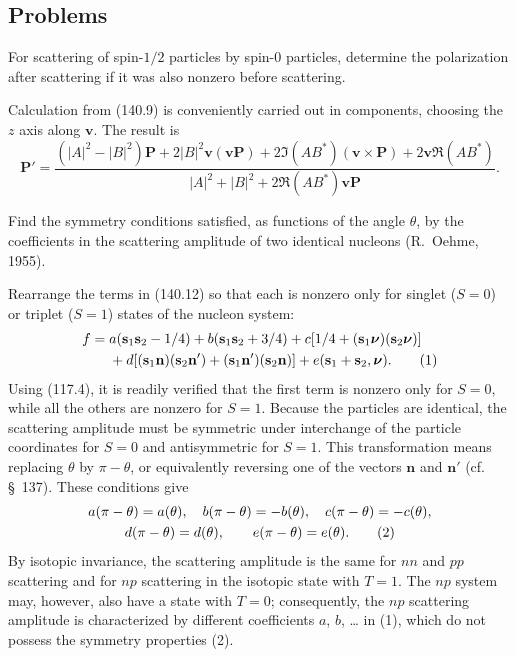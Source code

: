 \subsection*{Problems}

 For scattering of spin-$1/2$ particles by spin-0 particles, determine the polarization after scattering if it was also nonzero before scattering.

\SolutionHeading Calculation from (140.9) is conveniently carried out in components, choosing the $z$ axis along $\mathbf v$. The result is
\[
 \mathbf P'=\frac{(|A|^2-|B|^2)\mathbf P+2|B|^2\mathbf v(\mathbf v\mathbf P)+2\Im(AB^*)(\mathbf v\times\mathbf P)+2\mathbf v\Re(AB^*)}{|A|^2+|B|^2+2\Re(AB^*)\mathbf v\mathbf P}.
\]

 Find the symmetry conditions satisfied, as functions of the angle $\theta$, by the coefficients in the scattering amplitude of two identical nucleons (R.~Oehme, 1955).

\SolutionHeading Rearrange the terms in (140.12) so that each is nonzero only for singlet ($S=0$) or triplet ($S=1$) states of the nucleon system:
\begin{align}
 f={}&a(\mathbf s_1\mathbf s_2-1/4)+b(\mathbf s_1\mathbf s_2+3/4)+c[1/4+(\mathbf s_1\boldsymbol\nu)(\mathbf s_2\boldsymbol\nu)]\notag\\
 &+d[(\mathbf s_1\mathbf n)(\mathbf s_2\mathbf n')+(\mathbf s_1\mathbf n')(\mathbf s_2\mathbf n)]+e(\mathbf s_1+\mathbf s_2,\boldsymbol\nu).
 \tag{1}
\end{align}
Using (117.4), it is readily verified that the first term is nonzero only for $S=0$, while all the others are nonzero for $S=1$. Because the particles are identical, the scattering amplitude must be symmetric under interchange of the particle coordinates for $S=0$ and antisymmetric for $S=1$. This transformation means replacing $\theta$ by $\pi-\theta$, or equivalently reversing one of the vectors $\mathbf n$ and $\mathbf n'$ (cf. \S~137). These conditions give
\begin{gather}
 a(\pi-\theta)=a(\theta),\quad b(\pi-\theta)=-b(\theta),\quad c(\pi-\theta)=-c(\theta),\notag\\
 d(\pi-\theta)=d(\theta),\qquad e(\pi-\theta)=e(\theta).
 \tag{2}
\end{gather}
By isotopic invariance, the scattering amplitude is the same for $nn$ and $pp$ scattering and for $np$ scattering in the isotopic state with $T=1$. The $np$ system may, however, also have a state with $T=0$; consequently, the $np$ scattering amplitude is characterized by different coefficients $a$, $b$, \ldots{} in (1), which do not possess the symmetry properties (2).
